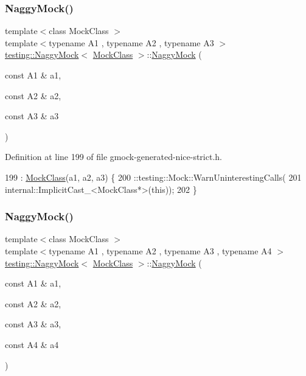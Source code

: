 \subsubsection{\texorpdfstring{Naggy\+Mock()}{NaggyMock()}\hspace{0.1cm}{\footnotesize\ttfamily [4/11]}}
{\footnotesize\ttfamily template$<$class Mock\+Class $>$ \\
template$<$typename A1 , typename A2 , typename A3 $>$ \\
\hyperlink{classtesting_1_1NaggyMock}{testing\+::\+Naggy\+Mock}$<$ \hyperlink{classMockClass}{Mock\+Class} $>$\+::\hyperlink{classtesting_1_1NaggyMock}{Naggy\+Mock} (\begin{DoxyParamCaption}\item[{const A1 \&}]{a1,  }\item[{const A2 \&}]{a2,  }\item[{const A3 \&}]{a3 }\end{DoxyParamCaption})\hspace{0.3cm}{\ttfamily [inline]}}



Definition at line 199 of file gmock-\/generated-\/nice-\/strict.\+h.


\begin{DoxyCode}
199                                                       : \hyperlink{classMockClass}{MockClass}(a1, a2, a3) \{
200     ::testing::Mock::WarnUninterestingCalls(
201         internal::ImplicitCast\_<MockClass*>(\textcolor{keyword}{this}));
202   \}
\end{DoxyCode}
\mbox{\label{classtesting_1_1NaggyMock_aa7d63f62600171db931c6bbb4c2a6d52}} 
\subsubsection{\texorpdfstring{Naggy\+Mock()}{NaggyMock()}\hspace{0.1cm}{\footnotesize\ttfamily [5/11]}}
{\footnotesize\ttfamily template$<$class Mock\+Class $>$ \\
template$<$typename A1 , typename A2 , typename A3 , typename A4 $>$ \\
\hyperlink{classtesting_1_1NaggyMock}{testing\+::\+Naggy\+Mock}$<$ \hyperlink{classMockClass}{Mock\+Class} $>$\+::\hyperlink{classtesting_1_1NaggyMock}{Naggy\+Mock} (\begin{DoxyParamCaption}\item[{const A1 \&}]{a1,  }\item[{const A2 \&}]{a2,  }\item[{const A3 \&}]{a3,  }\item[{const A4 \&}]{a4 }\end{DoxyParamCaption})\hspace{0.3cm}{\ttfamily [inline]}}



